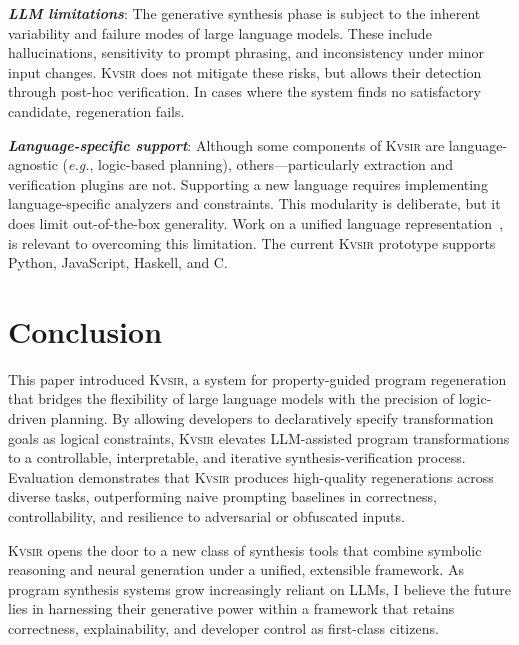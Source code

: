 \documentclass[sigplan,review,anonymous,10pt]{acmart}
\def\eg{{\em e.g.}, }
\newcommand{\sys}{{\scshape Kv{\textalpha}sir}\xspace}
\newcommand{\heading}[1]{\vspace{2pt}\noindent\textbf{\emph{#1}}:\enspace}
\begin{document}
\heading{LLM limitations}
The generative synthesis phase
is subject to the inherent variability and failure modes
of large language models.
These include hallucinations,
sensitivity to prompt phrasing,
and inconsistency
under minor input changes.
\sys does not mitigate these risks,
but allows their detection
through post-hoc verification.
In cases where the system finds no satisfactory candidate,
regeneration fails.

\heading{Language-specific support}
Although some components of \sys are language-agnostic (\eg logic-based planning),
others---particularly extraction and verification plugins are not.
Supporting a new language
requires implementing language-specific analyzers and constraints.
This modularity is deliberate,
but it does limit out-of-the-box generality.
Work on a unified language representation~\cite{koppel2018onetool,bap2011,dillig2009sail},
is relevant to overcoming this limitation.
The current \sys prototype
supports Python, JavaScript, Haskell, and C. 


\section{Conclusion}
This paper introduced \sys, a system for property-guided program regeneration
that bridges the flexibility of large language models with the precision of
logic-driven planning.
By allowing developers to declaratively specify
transformation goals as logical constraints, \sys elevates LLM-assisted program
transformations to a controllable, interpretable, and iterative synthesis-verification
process.
Evaluation demonstrates that \sys produces high-quality regenerations
across diverse tasks, outperforming naive prompting baselines in correctness,
controllability, and resilience to adversarial or obfuscated inputs.

\sys opens the door to a new class of synthesis tools that combine symbolic
reasoning and neural generation under a unified, extensible framework.
As program synthesis systems grow increasingly reliant on LLMs, I believe the
future lies in harnessing their generative power within a framework that retains
correctness, explainability, and developer control as first-class citizens.
\end{document}
